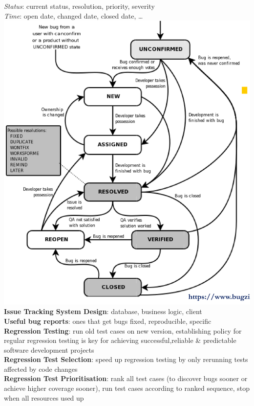 \documentclass[a4paper]{article}
\begin{document}
\begin{multicols}{3}
        \textit{Status}: current status, resolution, priority, severity\\
        \textit{Time}: open date, changed date, closed date, \ldots\\
        \includegraphics[width=\linewidth]{359.png}\\
        \textbf{Issue Tracking System Design}: database, business logic, client\\
        \textbf{Useful bug reports}: ones that get bugs fixed, reproducible, specific\\
        \textbf{Regression Testing}: run old test cases on new version, establishing policy for regular regression testing is key for achieving successful,reliable \& predictable software development projects\\
        \textbf{Regression Test Selection}: speed up regression testing by only rerunning tests affected by code changes\\
        \textbf{Regression Test Prioritisation}: rank all test cases (to discover bugs sooner or achieve higher coverage sooner), run test cases according to ranked sequence, stop when all resources used up\\

\end{multicols}
\end{document}
